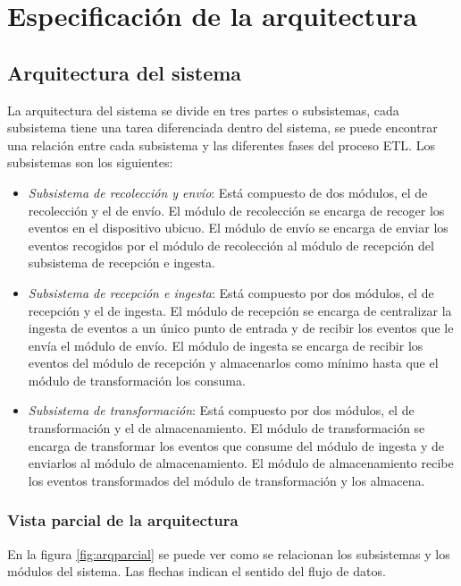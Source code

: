 \chapter{Especificación de la arquitectura}

\section{Arquitectura del sistema}
La arquitectura del sistema se divide en tres partes o subsistemas, cada subsistema tiene una tarea diferenciada dentro del sistema, se puede encontrar una relación entre cada subsistema y las diferentes fases del proceso ETL. Los subsistemas son los siguientes:

\begin{itemize}
	\item \textit{Subsistema de recolección y envío}: Está compuesto de dos módulos, el de recolección y el de envío. El módulo de recolección se encarga de recoger los eventos en el dispositivo ubicuo. El módulo de envío se encarga de enviar los eventos recogidos por el módulo de recolección al módulo de recepción del subsistema de recepción e ingesta.
	
	\item \textit{Subsistema de recepción e ingesta}: Está compuesto por dos módulos, el de recepción y el de ingesta. El módulo de recepción se encarga de centralizar la ingesta de eventos a un único punto de entrada y  de recibir los eventos que le envía el módulo de envío. El módulo de ingesta se encarga de recibir los eventos del módulo de recepción y almacenarlos como mínimo hasta que el módulo de transformación los consuma.

	\item \textit{Subsistema de transformación}:  Está compuesto por dos módulos, el de transformación y el de almacenamiento. El módulo de transformación se encarga de transformar los eventos que consume del módulo de ingesta y de enviarlos al módulo de almacenamiento. El módulo de almacenamiento recibe los eventos transformados del módulo de transformación y los almacena.
\end{itemize}

\subsection{Vista parcial de la arquitectura}
En la figura \ref{fig:arqparcial} se puede ver como se relacionan los subsistemas y los módulos del sistema. Las flechas indican el sentido del flujo de datos.

